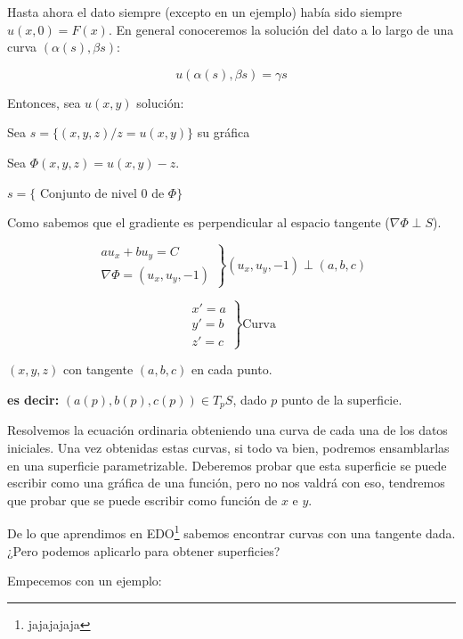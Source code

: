 	Hasta ahora el dato siempre (excepto en un ejemplo)%
	había sido siempre $u(x,0) = F(x)$. En general conoceremos la solución del dato a lo largo de una curva $(\alpha(s),\beta{s})$:

	$$ u(\alpha(s),\beta{s}) = \gamma{s} $$

	Entonces, sea $u(x,y)$ solución:

	Sea $s = \{(x,y,z) / z = u(x,y)\}$ su gráfica

	Sea $\Phi(x,y,z) = u(x,y) - z$.

	$s = \{$ Conjunto de nivel 0 de $ \Phi \}$

	Como sabemos que el gradiente es perpendicular al espacio tangente ($\nabla \Phi \perp S$).

	\begin{equation*}
		\left.
		\begin{array}{rl}
			au_x + bu_y = C \\
			\nabla \Phi = (u_x, u_y, -1)
		\end{array}
		\right\} (u_x,u_y, -1) \perp (a,b,c)
	\end{equation*}

	\begin{equation*}
		\left.
		\begin{array}{rl}
			x' = a \\
			y' = b \\
			z' = c
		\end{array}
		\right\} \text{Curva}
	\end{equation*}

	$(x,y,z)$ con tangente $(a,b,c)$ en cada punto.

	\textbf{es decir:} $(a(p),b(p),c(p)) \in T_pS$, dado $p$ punto de la superficie.


	Resolvemos la ecuación ordinaria obteniendo una curva de cada una de los datos iniciales. Una vez obtenidas estas curvas, si todo va bien, podremos ensamblarlas en una superficie parametrizable. Deberemos probar que esta superficie se puede escribir como una gráfica de una función, pero no nos valdrá con eso, tendremos que probar que se puede escribir como función de $x$ e $y$.

	De lo que aprendimos en EDO\footnote{jajajajaja} sabemos encontrar curvas con una tangente dada. ¿Pero podemos aplicarlo para obtener superficies?

	Empecemos con un ejemplo:

